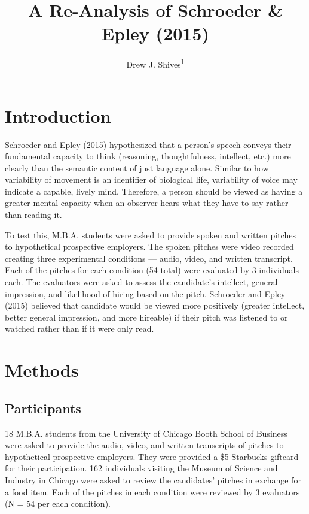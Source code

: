 \documentclass[
  english,
  man]{apa6}
\title{A Re-Analysis of Schroeder \& Epley (2015)}
\author{Drew J. Shives\textsuperscript{1}}
\date{}
\affiliation{\vspace{0.5cm}\textsuperscript{1} The Graduate Center of the City University of New York}
\begin{document}
\maketitle

\hypertarget{introduction}{%
\section{Introduction}\label{introduction}}

Schroeder and Epley (2015) hypothesized that a person's speech conveys their fundamental capacity to think (reasoning, thoughtfulness, intellect, etc.) more clearly than the semantic content of just language alone. Similar to how variability of movement is an identifier of biological life, variability of voice may indicate a capable, lively mind. Therefore, a person should be viewed as having a greater mental capacity when an observer hears what they have to say rather than reading it.

To test this, M.B.A. students were asked to provide spoken and written pitches to hypothetical prospective employers. The spoken pitches were video recorded creating three experimental conditions --- audio, video, and written transcript. Each of the pitches for each condition (54 total) were evaluated by 3 individuals each. The evaluators were asked to assess the candidate's intellect, general impression, and likelihood of hiring based on the pitch. Schroeder and Epley (2015) believed that candidate would be viewed more positively (greater intellect, better general impression, and more hireable) if their pitch was listened to or watched rather than if it were only read.

\hypertarget{methods}{%
\section{Methods}\label{methods}}

\hypertarget{participants}{%
\subsection{Participants}\label{participants}}

18 M.B.A. students from the University of Chicago Booth School of Business were asked to provide the audio, video, and written transcripts of pitches to hypothetical prospective employers. They were provided a \$5 Starbucks giftcard for their participation. 162 individuals visiting the Museum of Science and Industry in Chicago were asked to review the candidates' pitches in exchange for a food item. Each of the pitches in each condition were reviewed by 3 evaluators (N = 54 per each condition).
\end{document}
